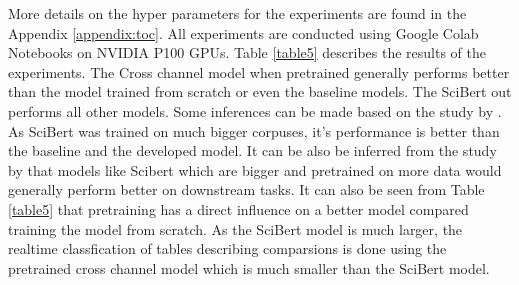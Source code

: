More details on the hyper parameters for the experiments are found in the Appendix \ref{appendix:toc}.
All experiments are conducted using Google Colab Notebooks on NVIDIA P100 GPUs. Table \ref{table5} describes the results of the experiments. The Cross channel model when pretrained generally performs better than the model trained from scratch or even the baseline models. The SciBert out performs all other models. Some inferences can be made based on the study by \cite{hernandez2021scaling}. As SciBert was trained on much bigger corpuses, it's performance is better than the baseline and the developed model. It can be also be inferred from the study by \cite{hernandez2021scaling} that models like Scibert which are bigger and pretrained on more data would generally perform better on downstream tasks. It can also be seen from Table \ref{table5} that pretraining has a direct influence on a better model compared training the model from scratch. As the SciBert model is much larger, the realtime classfication of tables describing comparsions is done using the pretrained cross channel model which is much smaller than the SciBert model.  